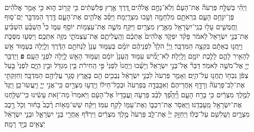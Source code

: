 \documentclass[twoside, openany, parskip=half, 11pt]{book}
\begin{document}
\begin{footnotesize}
\begin{multicols}{2}
\\
 וַיְהִ֗י בְּשַׁלַּ֣ח פַּרְעֹה֘ אֶת־הָעָם֒ וְלֹֽא־נָחָ֣ם אֱלֹהִ֗ים דֶּ֚רֶךְ אֶ֣רֶץ פְּלִשְׁתִּ֔ים כִּ֥י קָר֖וֹב ה֑וּא כִּ֣י אָמַ֣ר אֱלֹהִ֗ים פֶּן־יִנָּחֵ֥ם הָעָ֛ם בִּרְאֹתָ֥ם מִלְחָמָ֖ה וְשָׁ֥בוּ מִצְרָֽיְמָה׃ וַיַּסֵּ֨ב אֱלֹהִ֧ים אֶת־הָעָ֛ם דֶּ֥רֶךְ הַמִּדְבָּ֖ר יַם־ס֑וּף וַֽחֲמֻשִׁ֛ים עָל֥וּ בְנֵֽי־יִשְׂרָאֵ֖ל מֵאֶ֥רֶץ מִצְרָֽיִם׃ וַיִּקַּ֥ח מֹשֶׁ֛ה אֶת־עַצְמ֥וֹת יוֹסֵ֖ף עִמּ֑וֹ כִּי֩ הַשְׁבֵּ֨עַ הִשְׁבִּ֜יעַ אֶת־בְּנֵ֤י יִשְׂרָאֵל֙ לֵאמֹ֔ר פָּקֹ֨ד יִפְקֹ֤ד אֱלֹהִים֙ אֶתְכֶ֔ם וְהַֽעֲלִיתֶ֧ם אֶת־עַצְמֹתַ֛י מִזֶּ֖ה אִתְּכֶֽם׃
 וַיִּסְע֖וּ מִסֻּכֹּ֑ת וַיַּֽחֲנ֣וּ בְאֵתָ֔ם בִּקְצֵ֖ה הַמִּדְבָּֽר׃ וַֽיְיָ֡ הֹלֵךְ֩ לִפְנֵיהֶ֨ם יוֹמָ֜ם בְּעַמּ֤וּד עָנָן֙ לַנְחֹתָ֣ם הַדֶּ֔רֶךְ וְלַ֛יְלָה בְּעַמּ֥וּד אֵ֖שׁ לְהָאִ֣יר לָהֶ֑ם לָלֶ֖כֶת יוֹמָ֥ם וָלָֽיְלָה׃ לֹֽא־יָמִ֞ישׁ עַמּ֤וּד הֶֽעָנָן֙ יוֹמָ֔ם וְעַמּ֥וּד הָאֵ֖שׁ לָ֑יְלָה לִפְנֵ֖י הָעָֽם׃ \textbf{פ} 
 וַיְדַבֵּ֥ר יְיָ֖ אֶל־מֹשֶׁ֥ה לֵּאמֹֽר׃ דַּבֵּר֘ אֶל־בְּנֵ֣י יִשְׂרָאֵל֒ וְיָשֻׁ֗בוּ וְיַֽחֲנוּ֙ לִפְנֵי֙ פִּ֣י הַֽחִירֹ֔ת בֵּ֥ין מִגְדֹּ֖ל וּבֵ֣ין הַיָּ֑ם לִפְנֵי֙ בַּ֣עַל צְפֹ֔ן נִכְח֥וֹ תַֽחֲנ֖וּ עַל־הַיָּֽם׃ וְאָמַ֤ר פַּרְעֹה֙ לִבְנֵ֣י יִשְׂרָאֵ֔ל נְבֻכִ֥ים הֵ֖ם בָּאָ֑רֶץ סָגַ֥ר עֲלֵיהֶ֖ם הַמִּדְבָּֽר׃ וְחִזַּקְתִּ֣י אֶת־לֵב־פַּרְעֹה֘ וְרָדַ֣ף אַֽחֲרֵיהֶם֒ וְאִכָּֽבְדָ֤ה בְּפַרְעֹה֙ וּבְכָל־חֵיל֔וֹ וְיָֽדְע֥וּ מִצְרַ֖יִם כִּֽי־אֲנִ֣י יְיָ֑ וַיַּֽעֲשׂוּ־כֵֽן׃
 וַיֻּגַּד֙ לְמֶ֣לֶךְ מִצְרַ֔יִם כִּ֥י בָרַ֖ח הָעָ֑ם וַיֵּֽ֠הָפֵ֠ךְ לְבַ֨ב פַּרְעֹ֤ה וַֽעֲבָדָיו֙ אֶל־הָעָ֔ם וַיֹּֽאמְרוּ֙ מַה־זֹּ֣את עָשִׂ֔ינוּ כִּֽי־שִׁלַּ֥חְנוּ אֶת־יִשְׂרָאֵ֖ל מֵֽעָבְדֵֽנוּ׃ וַיֶּאְסֹ֖ר אֶת־רִכְבּ֑וֹ וְאֶת־עַמּ֖וֹ לָקַ֥ח עִמּֽוֹ׃ וַיִּקַּ֗ח שֵׁשׁ־מֵא֥וֹת רֶ֨כֶב֙ בָּח֔וּר וְכֹ֖ל רֶ֣כֶב מִצְרָ֑יִם וְשָֽׁלִשִׁ֖ם עַל־כֻּלּֽוֹ׃ וַיְחַזֵּ֣ק יְיָ֗ אֶת־לֵ֤ב פַּרְעֹה֙ מֶ֣לֶךְ מִצְרַ֔יִם וַיִּרְדֹּ֕ף אַֽחֲרֵ֖י בְּנֵ֣י יִשְׂרָאֵ֑ל וּבְנֵ֣י יִשְׂרָאֵ֔ל יֹֽצְאִ֖ים בְּיָ֥ד רָמָֽה׃


\end{multicols}
\end{footnotesize}
\end{document}
